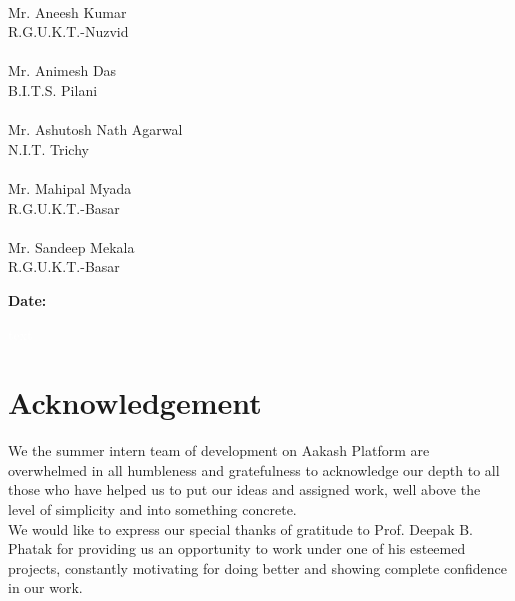\documentclass[12pt]{report}
\begin{document}
\vfill
\begin{flushright}

\underline{\hspace{5cm}} \\
Mr. Aneesh Kumar \\
R.G.U.K.T.-Nuzvid \\

\vfill
\underline{\hspace{5cm}} \\
Mr. Animesh Das \\
B.I.T.S. Pilani \\

\vfill
\underline{\hspace{5cm}} \\
Mr. Ashutosh Nath Agarwal \\ 
N.I.T. Trichy \\

\vfill
\underline{\hspace{5cm}} \\
Mr. Mahipal Myada \\
R.G.U.K.T.-Basar\\

\vfill
\underline{\hspace{5cm}} \\
Mr. Sandeep Mekala \\
R.G.U.K.T.-Basar\\

\vfill
\end{flushright}

\begin{flushleft}
\textbf{Date:} \underline{\hspace{5cm}}
\end{flushleft}

 \pagebreak \thispagestyle{empty} \textcolor{white}{text} \pagebreak


\chapter*{Acknowledgement}
We the summer intern team of development on Aakash Platform are overwhelmed in all humbleness and gratefulness to acknowledge our depth to all those who have helped us to put our ideas and assigned work, well above the level of simplicity and into something concrete. \\

We would like to express our special thanks of gratitude to Prof. Deepak B. Phatak for providing us an opportunity to work under one of his esteemed projects, constantly motivating for doing better and showing complete confidence in our work. \\
\end{document}
